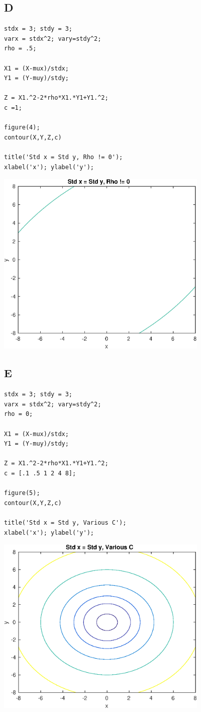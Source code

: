 \documentclass[12pt]{article}
\begin{document}
\subsection*{D}

\begin{verbatim}
stdx = 3; stdy = 3;
varx = stdx^2; vary=stdy^2;
rho = .5;

X1 = (X-mux)/stdx;
Y1 = (Y-muy)/stdy;

Z = X1.^2-2*rho*X1.*Y1+Y1.^2;
c =1;

figure(4);
contour(X,Y,Z,c)

title('Std x = Std y, Rho != 0');
xlabel('x'); ylabel('y');
\end{verbatim}

\includegraphics [width=4in]{prob_5_75_04.eps}


\subsection*{E}

\begin{verbatim}
stdx = 3; stdy = 3;
varx = stdx^2; vary=stdy^2;
rho = 0;

X1 = (X-mux)/stdx;
Y1 = (Y-muy)/stdy;

Z = X1.^2-2*rho*X1.*Y1+Y1.^2;
c = [.1 .5 1 2 4 8];

figure(5);
contour(X,Y,Z,c)

title('Std x = Std y, Various C');
xlabel('x'); ylabel('y');
\end{verbatim}

\includegraphics [width=4in]{prob_5_75_05.eps}
\end{document}
